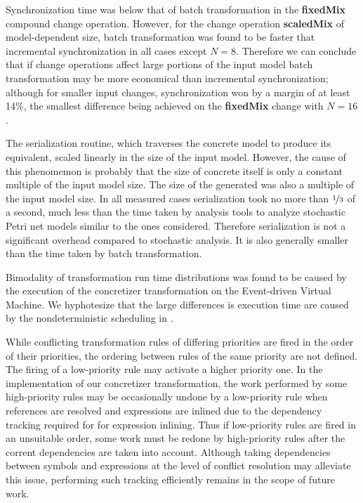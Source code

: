 \begin{description}
  Synchronization time was below that of batch transformation in the \textbf{fixed\-Mix} compound change operation. However, for the change operation \textbf{scaled\-Mix} of model-dependent size, batch transformation was found to be faster that incremental synchronization in all cases except \(N = 8\). Therefore we can conclude that if change operations affect large portions of the input model batch transformation may be more economical than incremental synchronization; although for smaller input changes, synchronization won by a margin of at least 14\%, the smallest difference being achieved on the \textbf{fixed\-Mix} change with \(N = 16\).
\item[\textabbr{RQ3}] The  serialization routine, which traverses the concrete  model to produce its  equivalent, scaled linearly in the size of the input model. However, the cause of this phenomemon is probably that the size of concrete  itself is only a constant multiple of the input model size. The size of the generated  was also a multiple of the input model size. In all measured cases  serialization took no more than \(\nicefrac{1}{3}\) of a second, much less than the time taken by analysis tools to analyze stochastic Petri net models similar to the ones considered. Therefore  serialization is not a significant overhead compared to stochastic analysis. It is also generally smaller than the time taken by batch transformation.
\end{description}

Bimodality of transformation run time distributions was found to be caused by the execution of the  concretizer transformation on the  Event-driven Virtual Machine. We hyphotesize that the large differences is execution time are caused by the nondeterministic scheduling in .

While conflicting transformation rules of differing priorities are fired in the order of their priorities, the ordering between rules of the same priority are not defined. The firing of a low-priority rule may activate a higher priority one. In the implementation of our concretizer transformation, the work performed by some high-priority rules may be occasionally undone by a low-priority rule when  references are resolved and expressions are inlined due to the dependency tracking required for for expression inlining. Thus if low-priority rules are fired in an unsuitable order, some work must be redone by high-priority rules after the corrent dependencies are taken into account. Although taking dependencies between  symbols and expressions at the level of  conflict resolution may alleviate this issue, performing such tracking efficiently remains in the scope of future work.


